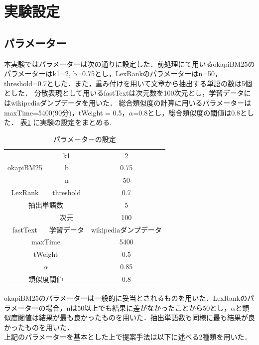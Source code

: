 \section{実験設定}
\label{exp:setting}
\subsection{パラメーター}
本実験ではパラメーターは次の通りに設定した．前処理にて用いるokapiBM25のパラメーターはk1=2, b=0.75とし，LexRankのパラメーターはn=50，threshold=0.7とした．また，重み付けを用いて文章から抽出する単語の数は5個とした．
分散表現として用いるfastTextは次元数を100次元とし，学習データにはwikipediaダンプデータを用いた．
総合類似度の計算に用いるパラメーターはmaxTime=5400(90分)，tWeight = 0.5，$\alpha$=0.8とし，総合類似度の閾値は0.8とした．
表\ref{table:par} に実験の設定をまとめる.
\begin{table}[htbp]
\begin{center}
  \begin{tabular}{| c | c |  c |} \hline
      & k1 &  2 \\ \cline{2-3}
    okapiBM25 & b & 0.75 \\ \cline{2-3} \hline
     & n &  50 \\ \cline{2-3}
    LexRank & threshold & 0.7 \\ \cline{2-3} \hline
     \multicolumn{2}{|c|}{抽出単語数} & 5 \\  \hline
     & 次元 &  100 \\ \cline{2-3} 
    fastText & 学習データ & wikipediaダンプデータ \\ \cline{2-3} \hline
     \multicolumn{2}{|c|}{maxTime} & 5400 \\  \hline
     \multicolumn{2}{|c|}{tWeight} & 0.5 \\  \hline
       \multicolumn{2}{|c|}{$\alpha$} & 0.85 \\  \hline
     \multicolumn{2}{|c|}{類似度閾値} & 0.8 \\  \hline
  \end{tabular}
  \caption{パラメーターの設定}
  \label{table:par}
  \end{center}
\end{table}

okapiBM25のパラメーターは一般的に妥当とされる\cite{infoRetrieval}ものを用いた．LexRankのパラメーターの場合，nは50以上でも結果に差がなかったことから50とし，$\alpha$と類似度閾値は結果が最も良かったものを用いた．抽出単語数も同様に最も結果が良かったものを用いた．
\\
上記のパラメーターを基本とした上で提案手法は以下に述べる2種類を用いた．
